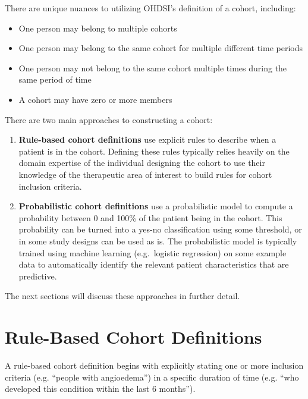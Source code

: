 \documentclass[11pt]{book}
\providecommand{\tightlist}{%
  \setlength{\itemsep}{0pt}\setlength{\parskip}{0pt}}
\theoremstyle{definition}
\theoremstyle{definition}
\theoremstyle{definition}
\theoremstyle{remark}
\begin{document}
 There are unique nuances to utilizing OHDSI's
definition of a cohort, including:

\begin{itemize}
\tightlist
\item
  One person may belong to multiple cohorts
\item
  One person may belong to the same cohort for multiple different time
  periods
\item
  One person may not belong to the same cohort multiple times during the
  same period of time
\item
  A cohort may have zero or more members
\end{itemize}

There are two main approaches to constructing a cohort:

\begin{enumerate}
\def\labelenumi{\arabic{enumi}.}
\tightlist
\item
  \textbf{Rule-based cohort definitions} use explicit rules to describe
  when a patient is in the cohort. Defining these rules typically relies
  heavily on the domain expertise of the individual designing the cohort
  to use their knowledge of the therapeutic area of interest to build
  rules for cohort inclusion criteria.
\item
  \textbf{Probabilistic cohort definitions} use a probabilistic model to
  compute a probability between 0 and 100\% of the patient being in the
  cohort. This probability can be turned into a yes-no classification
  using some threshold, or in some study designs can be used as is. The
  probabilistic model is typically trained using machine learning
  (e.g.~logistic regression) on some example data to automatically
  identify the relevant patient characteristics that are predictive.
\end{enumerate}

The next sections will discuss these approaches in further detail.

\section{Rule-Based Cohort
Definitions}\label{rule-based-cohort-definitions}

A rule-based cohort definition begins with explicitly stating one or
more inclusion criteria (e.g. ``people with angioedema'') in a specific
duration of time (e.g. ``who developed this condition within the last 6
months''). 
\end{document}
